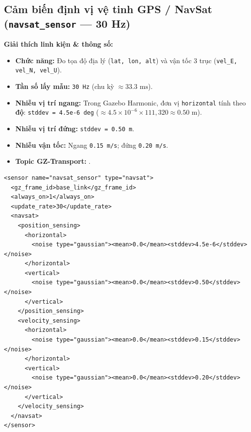 \documentclass[11pt,a4paper]{article}
\begin{document}
\vspace{1em}

\subsection{Cảm biến định vị vệ tinh GPS / NavSat (\texttt{navsat\_sensor} — 30 Hz)}
\noindent
\begin{minipage}[t]{0.45\textwidth}
\vspace{0pt}
\textbf{Giải thích linh kiện \& thông số:}
\begin{itemize}
    \item \textbf{Chức năng:} Đo tọa độ địa lý (\texttt{lat, lon, alt}) và vận tốc 3 trục (\texttt{vel\_E, vel\_N, vel\_U}).
    \item \textbf{Tần số lấy mẫu:} \texttt{30 Hz} (chu kỳ $\approx 33.3\text{ ms}$).
    \item \textbf{Nhiễu vị trí ngang:} Trong Gazebo Harmonic, đơn vị \texttt{horizontal} tính theo \textbf{độ}: \texttt{stddev = 4.5e-6 deg} ($\approx 4.5\times 10^{-6} \times 111{,}320 \approx 0.50\text{ m}$).
    \item \textbf{Nhiễu vị trí đứng:} \texttt{stddev = 0.50 m}.
    \item \textbf{Nhiễu vận tốc:} Ngang \texttt{0.15 m/s}; đứng \texttt{0.20 m/s}.
    \item \textbf{Topic GZ-Transport:} .
\end{itemize}
\end{minipage}
\hfill
\begin{minipage}[t]{0.52\textwidth}
\vspace{0pt}
\begin{lstlisting}[language=SDF, firstnumber=304]
<sensor name="navsat_sensor" type="navsat">
  <gz_frame_id>base_link</gz_frame_id>
  <always_on>1</always_on>
  <update_rate>30</update_rate>
  <navsat>
    <position_sensing>
      <horizontal>
        <noise type="gaussian"><mean>0.0</mean><stddev>4.5e-6</stddev></noise>
      </horizontal>
      <vertical>
        <noise type="gaussian"><mean>0.0</mean><stddev>0.50</stddev></noise>
      </vertical>
    </position_sensing>
    <velocity_sensing>
      <horizontal>
        <noise type="gaussian"><mean>0.0</mean><stddev>0.15</stddev></noise>
      </horizontal>
      <vertical>
        <noise type="gaussian"><mean>0.0</mean><stddev>0.20</stddev></noise>
      </vertical>
    </velocity_sensing>
  </navsat>
</sensor>
\end{lstlisting}
\end{minipage}
\end{document}
